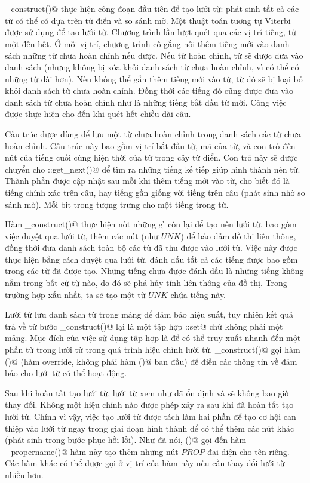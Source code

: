 \documentclass[a4paper,oneside,14pt]{extbook} %
\begin{document}
\verb@pre_construct()@ thực hiện công đoạn đầu tiên để tạo lưới từ:
phát sinh tất cả các từ có thể có dựa trên từ điển và so sánh mờ. Một
thuật toán tương tự Viterbi được sử dụng để tạo lưới từ. Chương trình
lần lượt quét qua các vị trí tiếng, từ một đến hết. Ở mỗi vị trí,
chương trình cố gắng nối thêm tiếng mới vào danh sách những từ chưa
hoàn chỉnh nếu được. Nếu từ hoàn chỉnh, từ sẽ được đưa vào danh sách
(nhưng không bị xóa khỏi danh sách từ chưa hoàn chỉnh, vì có thể có
những từ dài hơn). Nếu không thể gắn thêm tiếng mới vào từ, từ đó sẽ
bị loại bỏ khỏi danh sách từ chưa hoàn chỉnh. Đồng thời các tiếng đó
cũng được đưa vào danh sách từ chưa hoàn chỉnh như là những tiếng bắt
đầu từ mới. Công việc được thực hiện cho đến khi quét hết chiều dài
câu. 

Cấu trúc \verb@WordState@ được dùng để lưu một từ chưa hoàn chỉnh
trong danh sách các từ chưa hoàn chỉnh. Cấu trúc này bao gồm vị trí
bắt đầu từ, mã \verb@fuzid@ của từ, và con trỏ đến nút của tiếng cuối cùng
hiện thời của từ trong cây từ điển. Con trỏ này sẽ được chuyển cho
\verb@WordNode::get_next()@ để tìm ra những tiếng kế tiếp giúp hình
thành nên từ. Thành phần \verb@fuzid@ được cập nhật sau mỗi khi thêm
tiếng mới vào từ, cho biết đó là tiếng chính xác trên câu, hay tiếng
gần giống với tiếng trên câu (phát sinh nhờ so sánh mờ). Mỗi bit trong
\verb@fuzid@ tượng trưng cho một tiếng trong từ.

Hàm \verb@post_construct()@ thực hiện nốt những gì còn lại để tạo nên
lưới từ, bao gồm việc duyệt qua lưới từ, thêm các nút (như $UNK$)
để bảo đảm đồ thị liên thông, đồng thời đưa danh sách toàn bộ các từ
đã thu được vào lưới từ. Việc này được thực hiện bằng cách duyệt qua
lưới từ, đánh dấu tất cả các tiếng được bao gồm trong các từ đã được
tạo. Những tiếng chưa được đánh dấu là những tiếng không nằm trong bất
cứ từ nào, do đó sẽ phá hủy tính liên thông của đồ thị. Trong trường
hợp xấu nhất, ta sẽ tạo một từ $UNK$ chứa tiếng này.

Lưới từ lưu danh sách từ trong mảng để đảm bảo hiệu suất, tuy nhiên
kết quả trả về từ bước \verb@pre_construct()@ 
lại là một tập hợp \verb@std::set@ chứ không phải một mảng. Mục đích
của việc sử dụng tập hợp là để có thể truy xuất nhanh đến một phần từ
trong lưới từ trong quá trình hiệu chỉnh lưới
từ. \verb@post_construct()@ gọi hàm \verb@construct()@ (hàm override,
không phải hàm \verb@construct()@ ban đầu) để điền các thông tin về
\verb@WordInfos@ đảm bảo cho lưới từ có thể hoạt động.

Sau khi hoàn tất tạo lưới từ, lưới từ xem như đã ổn định và sẽ không
bao giờ thay đổi. Không một hiệu chỉnh nào được phép xảy ra sau khi đã
hoàn tất tạo lưới từ. Chính vì vậy, việc tạo lưới từ được tách làm hai
phần để tạo cơ hội can thiệp vào lưới từ ngay trong giai đoạn hình
thành để có thể thêm các nút khác (phát sinh trong bước phục hồi
lồi). Như đã nói, \verb@construct()@ gọi đến hàm
\verb@mark_propername()@ hàm này tạo thêm những nút $PROP$ đại diện
cho tên riêng. Các hàm khác có thể được gọi ở vị trí của hàm này nếu
cần thay đổi lưới từ nhiều hơn.
\end{document}
